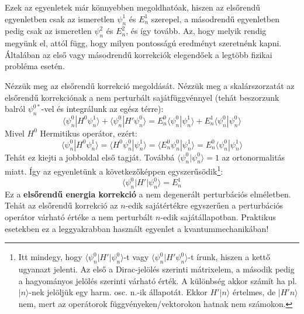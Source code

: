 \documentclass[../main.tex]{subfiles}
\begin{document}
Ezek az egyenletek már könnyebben megoldhatóak, hiszen az elsőrendű egyenletben csak az ismeretlen $\psi_n^1$ és $E_n^1$ szerepel, a másodrendű egyenletben pedig csak az ismeretlen $\psi_n^2$ és $E_n^2$, és így tovább.
Az, hogy melyik rendig megyünk el, attól függ, hogy milyen pontosságú eredményt szeretnénk kapni. Általában az első vagy másodrendű korrekciók elegendőek a legtöbb fizikai probléma esetén.

Nézzük meg az elsőrendű korrekció megoldását. Nézzük meg a skalárszorzatát az elsőrendű korrekciónak a nem perturbált sajátfüggvénnyel (tehát beszorzunk balról $\psi_n^{0*}$-vel és integrálunk az egész térre):
\begin{equation}
    \langle \psi_n^0 | H^0 \psi_n^1 \rangle + \langle \psi_n^0 | H' \psi_n^0 \rangle = E_n^0 \langle \psi_n^0 | \psi_n^1 \rangle + E_n^1 \langle \psi_n^0 | \psi_n^0 \rangle
\end{equation}
Mivel $H^0$ Hermitikus operátor, ezért:
\begin{equation}
    \langle \psi_n^0 | H^0 \psi_n^1 \rangle = \langle H^0 \psi_n^0 | \psi_n^1 \rangle = \langle E_n^0 \psi_n^0 | \psi_n^1 \rangle = E_n^0 \langle \psi_n^0 | \psi_n^1 \rangle
\end{equation}
Tehát ez kiejti a jobboldal első tagját. Továbbá $\langle \psi_n^0 | \psi_n^0 \rangle = 1$ az ortonormalitás miatt. Így az egyenletünk a következőképpen egyszerűsödik\footnote{Itt mindegy, hogy $\langle \psi_n^0 | H' | \psi_n^0 \rangle$-t vagy $\langle \psi_n^0 | H' \psi_n^0 \rangle$-t írunk, hiszen a kettő ugyanazt jelenti. Az első a Dirac-jelölés szerinti mátrixelem, a második pedig a hagyományos jelölés szerinti várható érték. A különbség akkor számít ha pl. $|n\rangle$-nek jelöljük egy harm. osc. n.-ik állapotát. Ekkor $H' | n \rangle$ értelmes, de $|H'n\rangle$ nem, mert az operátorok függvényeken/vektorokon hatnak nem számokon. }:
\begin{equation}
    \boxed{\langle \psi_n^0 | H' | \psi_n^0 \rangle = E_n^1}
\end{equation}
Ez a \textbf{elsőrendű energia korrekció} a nem degenerált perturbációs elméletben. Tehát az elsőrendű korrekció az $n$-edik sajátértékre egyszerűen a perturbációs operátor várható értéke a nem perturbált $n$-edik sajátállapotban.
Praktikus esetekben ez a leggyakrabban használt egyenlet a kvantummechanikában!
\end{document}

